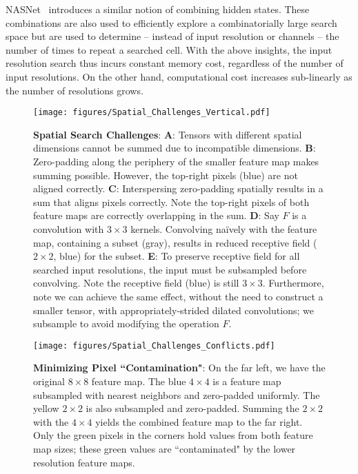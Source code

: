 \documentclass[10pt,twocolumn,letterpaper]{article}
\begin{document}
NASNet~\cite{nasnet} introduces a similar notion of combining hidden states. These combinations are also used to efficiently explore a combinatorially large search space but are used to determine -- instead of input resolution or channels -- the number of times to repeat a searched cell. With the above insights, the input resolution search thus incurs constant memory cost, regardless of the number of input resolutions. On the other hand, computational cost increases sub-linearly as the number of resolutions grows.

\begin{figure}
    \centering
    \texttt{[image: figures/Spatial\_Challenges\_Vertical.pdf]}
    \caption{\textbf{Spatial Search Challenges}: \textbf{A}: Tensors with different spatial dimensions cannot be summed due to incompatible dimensions. \textbf{B}: Zero-padding along the periphery of the smaller feature map makes summing possible. However, the top-right pixels (blue) are not aligned correctly. \textbf{C}: Interspersing zero-padding spatially results in a sum that aligns pixels correctly. Note the top-right pixels of both feature maps are correctly overlapping in the sum. \textbf{D}: Say $F$ is a convolution with $3\times3$ kernels. Convolving naïvely with the feature map, containing a subset (gray), results in reduced receptive field ($2\times2$, blue) for the subset. \textbf{E}: To preserve receptive field for all searched input resolutions, the input must be subsampled before convolving. Note the receptive field (blue) is still $3 \times 3$. Furthermore, note we can achieve the same effect, without the need to construct a smaller tensor, with appropriately-strided dilated convolutions; we subsample to avoid modifying the operation $F$.}
    \label{fig:spatial_challenges}
\end{figure}

\begin{figure}
    \centering
    \texttt{[image: figures/Spatial\_Challenges\_Conflicts.pdf]}
    \caption{\textbf{Minimizing Pixel ``Contamination"}: On the far left, we have the original $8\times8$ feature map. The blue $4\times4$ is a feature map subsampled with nearest neighbors and zero-padded uniformly. The yellow $2\times2$ is also subsampled and zero-padded. Summing the $2\times2$ with the $4\times4$ yields the combined feature map to the far right. Only the green pixels in the corners hold values from both feature map sizes; these green values are ``contaminated" by the lower resolution feature maps.}
    \label{fig:spatial_challenges_conflicts}
\end{figure}
\end{document}

